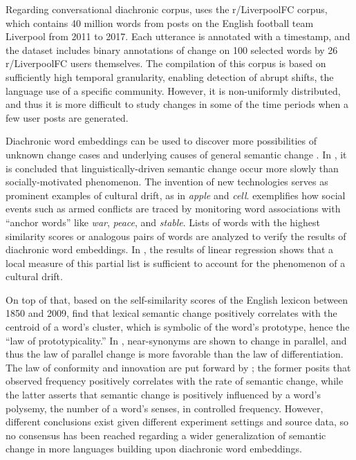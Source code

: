 Regarding conversational diachronic corpus, \parencite{giulianelli2019lexical} uses the r/LiverpoolFC corpus, which contains 40 million words from posts on the English football team Liverpool from 2011 to 2017. Each utterance is annotated with a timestamp, and the dataset includes binary annotations of change on 100 selected words by 26 r/LiverpoolFC users themselves. The compilation of this corpus is based on sufficiently high temporal granularity, enabling detection of abrupt shifts, the language use of a specific community. However, it is non-uniformly distributed, and thus it is more difficult to study changes in some of the time periods when a few user posts are generated.

Diachronic word embeddings can be used to discover more possibilities of unknown change cases and underlying causes of general semantic change \parencite{hamilton2016cultural}. In \textcite{hamilton2016cultural}, it is concluded that linguistically-driven semantic change occur more slowly than socially-motivated phenomenon. The invention of new technologies serves as prominent examples of cultural drift, as in \textit{apple} and \textit{cell}. \textcite{kutuzov2017tracing} exemplifies how social events such as armed conflicts are traced by monitoring word associations with ``anchor words'' like \textit{war}, \textit{peace}, and \textit{stable}. Lists of words with the highest similarity scores or analogous pairs of words are analyzed to verify the results of diachronic word embeddings. In \textcite{hamilton2016cultural}, the results of linear regression shows that a local measure of this partial list is sufficient to account for the phenomenon of a cultural drift.

On top of that, based on the self-similarity scores of the English lexicon between 1850 and 2009, \textcite{dubossarsky2015bottom} find that lexical semantic change positively correlates with the centroid of a word's cluster, which is symbolic of the word's prototype, hence the ``law of prototypicality.'' In \textcite{xu2015computational}, near-synonyms are shown to change in parallel, and thus the law of parallel change is more favorable than the law of differentiation. The law of conformity and innovation are put forward by \textcite{hamilton2016law}; the former posits that observed frequency positively correlates with the rate of semantic change, while the latter asserts that semantic change is positively influenced by a word's polysemy, the number of a word's senses, in controlled frequency. However, different conclusions exist given different experiment settings and source data, so no consensus has been reached regarding a wider generalization of semantic change in more languages building upon diachronic word embeddings.%

